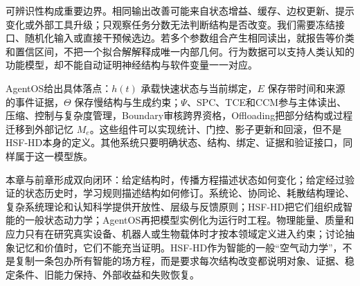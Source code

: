可辨识性构成重要边界。相同输出改善可能来自状态增益、缓存、边权更新、提示变化或外部工具升级；只观察任务分数无法判断结构是否改变。我们需要冻结接口、随机化输入或直接干预候选边。若多个参数组合产生相同读出，就报告等价类和置信区间，不把一个拟合解解释成唯一内部几何。行为数据可以支持人类认知的功能模型，却不能自动证明神经结构与软件变量一一对应。

AgentOS给出具体落点：$h(t)$ 承载快速状态与当前绑定，$E$ 保存带时间和来源的事件证据，$\Theta$ 保存慢结构与生成约束；$\Psi$、SPC、TCE和CCM参与主体读出、压缩、控制与复杂度管理，Boundary审核跨界资格，Offloading把部分结构或过程迁移到外部记忆 $M_e$。这些组件可以实现统计、门控、影子更新和回滚，但不是HSF-HD本身的定义。其他系统只要明确状态、结构、绑定、证据和验证接口，同样属于这一模型族。

本章与前章形成双向闭环：给定结构时，传播方程描述状态如何变化；给定经过验证的状态历史时，学习规则描述结构如何修订。系统论、协同论、耗散结构理论、复杂系统理论和认知科学提供开放性、层级与反馈原则；HSF-HD把它们组织成智能的一般状态动力学；AgentOS再把模型实例化为运行时工程。物理能量、质量和应力只有在研究真实设备、机器人或生物载体时才按本领域定义进入约束；讨论抽象记忆和价值时，它们不能充当证明。HSF-HD作为智能的一般“空气动力学”，不是复制一条包办所有智能的场方程，而是要求每次结构改变都说明对象、证据、稳定条件、旧能力保持、外部收益和失败恢复。
